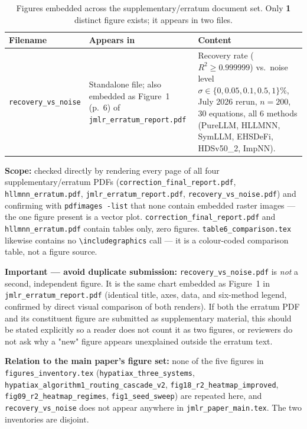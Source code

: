 
\begin{table}[H]
\centering
\caption{Figures embedded across the supplementary/erratum document set. Only
  \textbf{1} distinct figure exists; it appears in two files.}
\label{tab:figlist_supplementary}
\small
\renewcommand{\arraystretch}{1.25}
\begin{tabular}{L{5.2cm} L{3.6cm} L{5.3cm}}
\toprule
\textbf{Filename} & \textbf{Appears in} & \textbf{Content}\\
\midrule
\texttt{recovery\_vs\_noise} &
  Standalone file; also embedded as Figure~1 (p.~6) of
  \texttt{jmlr\_erratum\_report.pdf} &
  Recovery rate ($R^2\ge0.999999$) vs.\ noise level $\sigma\in\{0,0.05,0.1,
  0.5,1\}\%$, July 2026 rerun, $n{=}200$, 30 equations, all 6 methods
  (PureLLM, HLLMNN, SymLLM, EHSDeFi, HDSv50\_2, ImpNN).\\
\bottomrule
\end{tabular}
\end{table}

\noindent\textbf{Scope:} checked directly by rendering every page of all four
supplementary/erratum PDFs (\texttt{correction\_final\_report.pdf},
\texttt{hllmnn\_erratum.pdf}, \texttt{jmlr\_erratum\_report.pdf},
\texttt{recovery\_vs\_noise.pdf}) and confirming with \texttt{pdfimages -list}
that none contain embedded raster images --- the one figure present is a
vector plot. \texttt{correction\_final\_report.pdf} and
\texttt{hllmnn\_erratum.pdf} contain tables only, zero figures.
\texttt{table6\_comparison.tex} likewise contains no
\verb|\includegraphics| call --- it is a colour-coded comparison table, not a
figure source.

\noindent\textbf{Important --- avoid duplicate submission:} \texttt{recovery\_vs\_noise.pdf}
is \emph{not} a second, independent figure. It is the same chart embedded as
Figure~1 in \texttt{jmlr\_erratum\_report.pdf} (identical title, axes, data,
and six-method legend, confirmed by direct visual comparison of both renders).
If both the erratum PDF and its constituent figure are submitted as
supplementary material, this should be stated explicitly so a reader does not
count it as two figures, or reviewers do not ask why a "new" figure appears
unexplained outside the erratum text.

\noindent\textbf{Relation to the main paper's figure set:} none of the five
figures in \texttt{figures\_inventory.tex}
(\texttt{hypatiax\_three\_systems}, \texttt{hypatiax\_algorithm1\_routing\_cascade\_v2},
\texttt{fig18\_r2\_heatmap\_improved}, \texttt{fig09\_r2\_heatmap\_regimes},
\texttt{fig1\_seed\_sweep}) are repeated here, and \texttt{recovery\_vs\_noise}
does not appear anywhere in \texttt{jmlr\_paper\_main.tex}. The two inventories
are disjoint.
